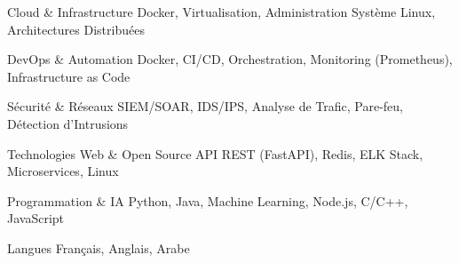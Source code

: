 

\begin{cvskills}

    \cvskill
    {Cloud \& Infrastructure} %
    {Docker, Virtualisation, Administration Système Linux, Architectures Distribuées} %

    \cvskill
    {DevOps \& Automation} %
    {Docker, CI/CD, Orchestration, Monitoring (Prometheus), Infrastructure as Code} %

    \cvskill
    {Sécurité \& Réseaux} %
    {SIEM/SOAR, IDS/IPS, Analyse de Trafic, Pare-feu, Détection d'Intrusions} %

    \cvskill
    {Technologies Web \& Open Source} %
    {API REST (FastAPI), Redis, ELK Stack, Microservices, Linux} %

    \cvskill
    {Programmation \& IA} %
    {Python, Java, Machine Learning, Node.js, C/C++, JavaScript} %

    \cvskill
    {Langues} %
    {Français, Anglais, Arabe} %

\end{cvskills}
